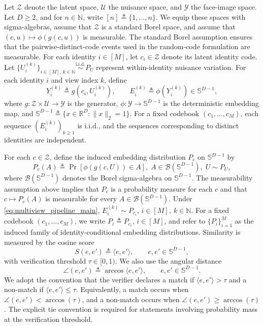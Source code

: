 \documentclass[journal]{IEEEtran}
\begin{document}
\begin{bibunit}
Let $\mathcal Z$ denote the latent space, $\mathcal U$ the nuisance space, and $\mathcal Y$ the face-image space. Let $D\ge2$, and for $n\in\mathbb N$, write $[n]\triangleq\{1,\ldots,n\}$. We equip these spaces with sigma-algebras, assume that $\mathcal Z$ is a standard Borel space, and assume that $(c,u)\mapsto\phi(g(c,u))$ is measurable. The standard Borel assumption ensures that the pairwise-distinct-code events used in the random-code formulation are measurable. For each identity $i\in[M]$, let $c_i\in\mathcal Z$ denote its latent identity code. Let $\{U_i^{(k)}\}_{i\in[M],\,k\in\mathbb N} \stackrel{\mathrm{i.i.d.}}{\sim}P_U$ represent within-identity nuisance variation. For each identity $i$ and view index $k$, define
%
\begin{equation}
Y_i^{(k)} \triangleq g(c_i,U_i^{(k)}),
\qquad E_i^{(k)} \triangleq \phi(Y_i^{(k)})\in\mathbb S^{D-1},
\label{eq:multiview_pipeline_main}
\end{equation}
%
where $g:\mathcal Z\times\mathcal U\to\mathcal Y$ is the generator, $\phi:\mathcal Y\to\mathbb S^{D-1}$ is the deterministic embedding map, and $\mathbb S^{D-1} \triangleq \{x\in\mathbb R^D:\|x\|_2=1\}$. For a fixed codebook $(c_1,\ldots,c_M)$, each sequence $(E_i^{(k)})_{k\ge1}$ is i.i.d., and the sequences corresponding to distinct identities are independent.


For each $c\in\mathcal Z$, define the induced embedding distribution $P_c$ on $\mathbb S^{D-1}$ by
%
\begin{equation}
P_c(A) \triangleq \Pr \left[\phi(g(c,U))\in A\right], \;
A\in\mathcal B(\mathbb S^{D-1}), \;
U\sim P_U,
\label{eq:Pc_def}
\end{equation}
%
where $\mathcal B(\mathbb S^{D-1})$ denotes the Borel sigma-algebra on $\mathbb S^{D-1}$. The measurability assumption above implies that $P_c$ is a probability measure for each $c$ and that $c\mapsto P_c(A)$ is measurable for every $A\in\mathcal B(\mathbb S^{D-1})$. Under \eqref{eq:multiview_pipeline_main}, $E_i^{(k)}\sim P_{c_i}$, $i\in[M],\ k\in\mathbb N$.
%
For a fixed codebook $(c_1,\ldots,c_M)$, we write $P_i\triangleq P_{c_i}$, $i\in[M]$, and refer to $\{P_i\}_{i=1}^M$ as the induced family of identity-conditional embedding distributions. Similarity is measured by the cosine score
%
\begin{equation}
S(e,e') \triangleq \langle e,e'\rangle,
\qquad e,e'\in\mathbb S^{D-1},
\label{eq:cosine_similarity_main}
\end{equation}
%
with verification threshold $\tau\in[0,1)$. We also use the angular distance
%
\begin{equation}
\angle(e,e') \triangleq \arccos\langle e,e'\rangle,
\qquad e,e'\in\mathbb S^{D-1}.
\label{eq:angle_definition_main}
\end{equation}
%
We adopt the convention that the verifier declares a match if $\langle e,e'\rangle>\tau$ and a non-match if $\langle e,e'\rangle\le\tau$. Equivalently, a match occurs when $\angle(e,e')<\arccos(\tau)$, and a non-match occurs when $\angle(e,e')\ge\arccos(\tau)$. The explicit tie convention is required for statements involving probability mass at the verification threshold.


\end{bibunit}
\end{document}
